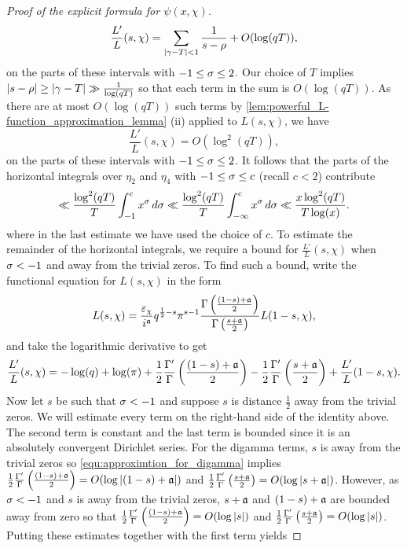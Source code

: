 \begin{proof}[Proof of the explicit formula for $\psi(x,\chi)$]
      \[
        \frac{L'}{L}(s,\chi) = \sum_{|\gamma-T| < 1}\frac{1}{s-\rho}+O(\log(qT)),
      \]
      on the parts of these intervals with $-1 \le \sigma \le 2$. Our choice of $T$ implies $|s-\rho| \ge |\gamma-T| \gg \frac{1}{\log(qT)}$ so that each term in the sum is $O(\log(qT))$. As there are at most $O(\log(qT))$ such terms by \cref{lem:powerful_L-function_approximation_lemma} (ii) applied to $L(s,\chi)$, we have
      \[
        \frac{L'}{L}(s,\chi) = O(\log^{2}(qT)),
      \]
      on the parts of these intervals with $-1 \le \sigma \le 2$. It follows that the parts of the horizontal integrals over $\eta_{2}$ and $\eta_{4}$ with  $-1 \le \sigma \le c$ (recall $c < 2$) contribute
      \begin{equation}\label{equ:explicit_formula_Dirichlet_proof_8}
        \ll \frac{\log^{2}(qT)}{T}\int_{-1}^{c}x^{\sigma}\,d\sigma \ll \frac{\log^{2}(qT)}{T}\int_{-\infty}^{c}x^{\sigma}\,d\sigma \ll \frac{x\log^{2}(qT)}{T\log(x)}.
      \end{equation}
      where in the last estimate we have used the choice of $c$. To estimate the remainder of the horizontal integrals, we require a bound for $\frac{L'}{L}(s,\chi)$ when $\sigma < -1$ and away from the trivial zeros. To find such a bound, write the functional equation for $L(s,\chi)$ in the form
      \[
        L(s,\chi) = \frac{\varepsilon_{\chi}}{i^{\mathfrak{a}}}q^{\frac{1}{2}-s}\pi^{s-1}\frac{\Gamma\left(\frac{(1-s)+\mathfrak{a}}{2}\right)}{\Gamma\left(\frac{s+\mathfrak{a}}{2}\right)}L(1-s,\chi),
      \]
      and take the logarithmic derivative to get
      \[
        \frac{L'}{L}(s,\chi) = -\log(q)+\log(\pi)+\frac{1}{2}\frac{\Gamma'}{\Gamma}\left(\frac{(1-s)+\mathfrak{a}}{2}\right)-\frac{1}{2}\frac{\Gamma'}{\Gamma}\left(\frac{s+\mathfrak{a}}{2}\right)+\frac{L'}{L}(1-s,\chi).
      \]
      Now let $s$ be such that $\sigma < -1$ and suppose $s$ is distance $\frac{1}{2}$ away from the trivial zeros. We will estimate every term on the right-hand side of the identity above. The second term is constant and the last term is bounded since it is an absolutely convergent Dirichlet series. For the digamma terms, $s$ is away from the trivial zeros so \cref{equ:approximtion_for_digamma} implies $\frac{1}{2}\frac{\Gamma'}{\Gamma}\left(\frac{(1-s)+\mathfrak{a}}{2}\right) = O(\log{|(1-s)+\mathfrak{a}|})$ and $\frac{1}{2}\frac{\Gamma'}{\Gamma}\left(\frac{s+\mathfrak{a}}{2}\right) = O(\log{|s+\mathfrak{a}|})$. However, as $\sigma < -1$ and $s$ is away from the trivial zeros, $s+\mathfrak{a}$ and $(1-s)+\mathfrak{a}$ are bounded away from zero so that $\frac{1}{2}\frac{\Gamma'}{\Gamma}\left(\frac{(1-s)+\mathfrak{a}}{2}\right) = O(\log{|s|})$ and $\frac{1}{2}\frac{\Gamma'}{\Gamma}\left(\frac{s+\mathfrak{a}}{2}\right) = O(\log{|s|})$. Putting these estimates together with the first term yields

\end{proof}
